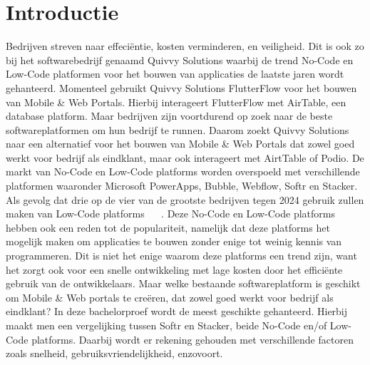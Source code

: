 
\section{Introductie}%
\label{sec:introductie}

Bedrijven streven naar effeciëntie, kosten  verminderen, en veiligheid. Dit is ook zo bij het softwarebedrijf genaamd Quivvy Solutions waarbij de trend No-Code en Low-Code
platformen voor het bouwen van applicaties de laatste jaren wordt gehanteerd. Momenteel gebruikt Quivvy Solutions FlutterFlow voor het bouwen van Mobile \& Web Portals. 
Hierbij interageert FlutterFlow met AirTable, een database platform. Maar bedrijven zijn voortdurend op zoek naar de beste softwareplatformen om hun bedrijf te runnen.
Daarom zoekt Quivvy Solutions naar een alternatief voor het bouwen van Mobile \& Web Portals dat zowel goed werkt voor bedrijf als eindklant, maar ook interageert met AirtTable of Podio.
De markt van No-Code en Low-Code platforms worden overspoeld met verschillende platformen waaronder Microsoft PowerApps, Bubble, Webflow, Softr en Stacker.
Als gevolg dat drie op de vier van de grootste bedrijven tegen 2024 gebruik zullen maken van Low-Code platforms ~\autocite{Moskal_2021} ~\autocite{Kulkarni_2021}.
Deze No-Code en Low-Code platforms hebben ook een reden tot de populariteit, namelijk dat
deze platforms het mogelijk maken om applicaties te bouwen zonder enige tot weinig kennis van programmeren. Dit is niet het enige waarom deze platforms een trend zijn,
want het zorgt ook voor een snelle ontwikkeling met lage kosten door het efficiënte gebruik van de ontwikkelaars.
Maar welke bestaande softwareplatform is geschikt om Mobile \& Web portals te creëren, dat zowel goed werkt voor bedrijf als eindklant?
In deze bachelorproef wordt de meest geschikte gehanteerd.
Hierbij maakt men een vergelijking tussen Softr en Stacker, beide No-Code en/of Low-Code platforms. Daarbij wordt er rekening gehouden met verschillende 
factoren zoals snelheid, gebruiksvriendelijkheid, enzovoort.




